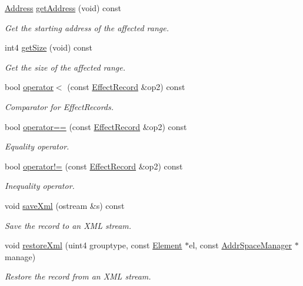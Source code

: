 \begin{DoxyCompactItemize}
\mbox{\hyperlink{class_address}{Address}} \mbox{\hyperlink{class_effect_record_a121118c3ba7a9efc73b04ce710af8dfe}{get\+Address}} (void) const
\begin{DoxyCompactList}\small\item\em Get the starting address of the affected range. \end{DoxyCompactList}\item 
int4 \mbox{\hyperlink{class_effect_record_a30bb645ee7f1a917b62cb9adb3f5dc75}{get\+Size}} (void) const
\begin{DoxyCompactList}\small\item\em Get the size of the affected range. \end{DoxyCompactList}\item 
bool \mbox{\hyperlink{class_effect_record_a2d5a13546e325d96f0224cb5a8b09403}{operator$<$}} (const \mbox{\hyperlink{class_effect_record}{Effect\+Record}} \&op2) const
\begin{DoxyCompactList}\small\item\em Comparator for Effect\+Records. \end{DoxyCompactList}\item 
bool \mbox{\hyperlink{class_effect_record_a2836f374f09e7ed7839505f5dd8b17b7}{operator==}} (const \mbox{\hyperlink{class_effect_record}{Effect\+Record}} \&op2) const
\begin{DoxyCompactList}\small\item\em Equality operator. \end{DoxyCompactList}\item 
bool \mbox{\hyperlink{class_effect_record_a5291ec5070dde1ee06f3cfefb2fcc21a}{operator!=}} (const \mbox{\hyperlink{class_effect_record}{Effect\+Record}} \&op2) const
\begin{DoxyCompactList}\small\item\em Inequality operator. \end{DoxyCompactList}\item 
void \mbox{\hyperlink{class_effect_record_a58c8ebeac9a93e93722adc7354e8748b}{save\+Xml}} (ostream \&s) const
\begin{DoxyCompactList}\small\item\em Save the record to an X\+ML stream. \end{DoxyCompactList}\item 
void \mbox{\hyperlink{class_effect_record_a4d01d27a405f3e595bc4e36bebfd33ca}{restore\+Xml}} (uint4 grouptype, const \mbox{\hyperlink{class_element}{Element}} $\ast$el, const \mbox{\hyperlink{class_addr_space_manager}{Addr\+Space\+Manager}} $\ast$manage)
\begin{DoxyCompactList}\small\item\em Restore the record from an X\+ML stream. \end{DoxyCompactList}\end{DoxyCompactItemize}


